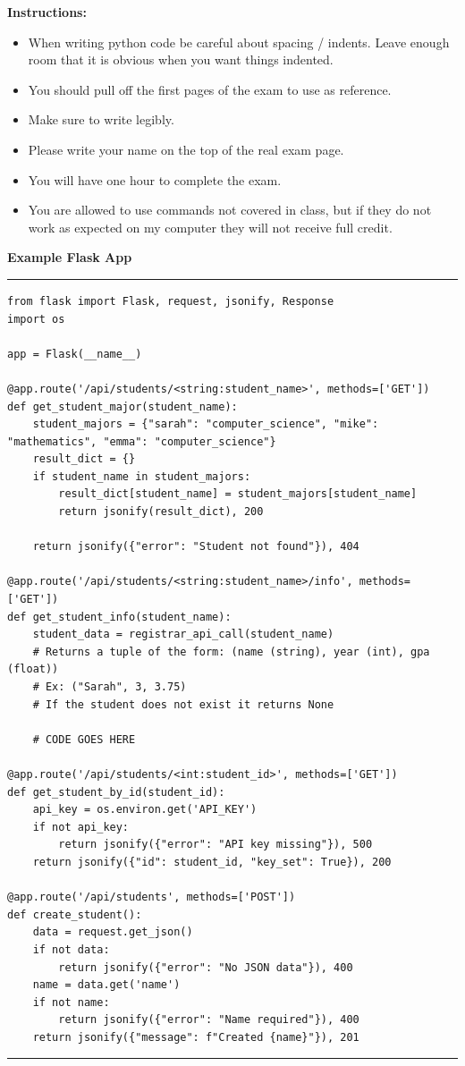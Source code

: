 \documentclass[11pt]{article}
\begin{document}
\noindent \textbf{Instructions:} \begin{itemize}
\item When writing python code be careful about spacing / indents. Leave enough room that it is obvious when you want things indented. 
\item You should pull off the first pages of the exam to use as reference.
\item Make sure to write legibly.
\item Please write your name on the top of the real exam page.
\item You will have one hour to complete the exam.
\item You are allowed to use commands not covered in class, but if they do not work as expected on my computer they will not receive full credit.
\end{itemize}

{\bf Example Flask App }
\\
{\color{lightgray}\hrule}

\begin{verbatim}
from flask import Flask, request, jsonify, Response
import os

app = Flask(__name__)

@app.route('/api/students/<string:student_name>', methods=['GET'])
def get_student_major(student_name):
    student_majors = {"sarah": "computer_science", "mike": "mathematics", "emma": "computer_science"}
    result_dict = {}
    if student_name in student_majors:
        result_dict[student_name] = student_majors[student_name]
        return jsonify(result_dict), 200
    
    return jsonify({"error": "Student not found"}), 404

@app.route('/api/students/<string:student_name>/info', methods=['GET'])
def get_student_info(student_name):
    student_data = registrar_api_call(student_name)
    # Returns a tuple of the form: (name (string), year (int), gpa (float))
    # Ex: ("Sarah", 3, 3.75) 
    # If the student does not exist it returns None
    
    # CODE GOES HERE

@app.route('/api/students/<int:student_id>', methods=['GET'])
def get_student_by_id(student_id):
    api_key = os.environ.get('API_KEY')
    if not api_key:
        return jsonify({"error": "API key missing"}), 500
    return jsonify({"id": student_id, "key_set": True}), 200

@app.route('/api/students', methods=['POST'])
def create_student():
    data = request.get_json()
    if not data:
        return jsonify({"error": "No JSON data"}), 400
    name = data.get('name')
    if not name:
        return jsonify({"error": "Name required"}), 400
    return jsonify({"message": f"Created {name}"}), 201
\end{verbatim}
{\color{lightgray}\hrule}
\end{document}
